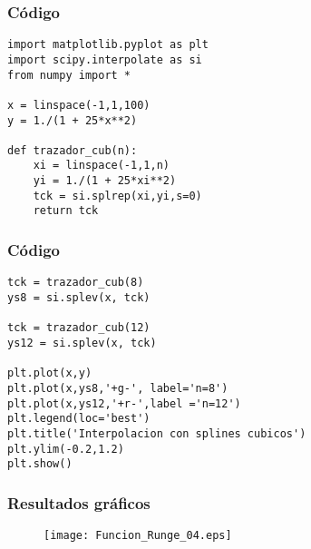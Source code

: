 \begin{frame}[fragile]
\frametitle{Código}
\begin{lstlisting}
import matplotlib.pyplot as plt
import scipy.interpolate as si
from numpy import *

x = linspace(-1,1,100)
y = 1./(1 + 25*x**2)

def trazador_cub(n):
    xi = linspace(-1,1,n)
    yi = 1./(1 + 25*xi**2)
    tck = si.splrep(xi,yi,s=0)
    return tck
\end{lstlisting}
\end{frame}
\begin{frame}[fragile]
\frametitle{Código}
\begin{lstlisting}
tck = trazador_cub(8)
ys8 = si.splev(x, tck)

tck = trazador_cub(12)
ys12 = si.splev(x, tck)

plt.plot(x,y)
plt.plot(x,ys8,'+g-', label='n=8')
plt.plot(x,ys12,'+r-',label ='n=12')
plt.legend(loc='best')
plt.title('Interpolacion con splines cubicos')
plt.ylim(-0.2,1.2)
plt.show()
\end{lstlisting}
\end{frame}
\begin{frame}
\frametitle{Resultados gráficos}
\begin{figure}
	\centering
	\texttt{[image: Funcion\_Runge\_04.eps]} 
\end{figure}
\end{frame}

